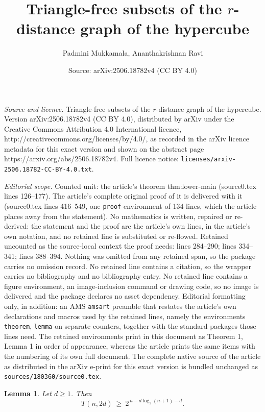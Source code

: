 \documentclass[10pt,a4paper]{amsart}
\title{Triangle-free subsets of the $r$-distance graph of the hypercube}
\author{Padmini Mukkamala, Ananthakrishnan Ravi}
\date{Source: arXiv:2506.18782v4 (CC BY 4.0)}
\newtheorem{lemma}{Lemma}
\begin{document}
\maketitle

\noindent\emph{Source and licence.} Triangle-free subsets of the $r$-distance graph of the hypercube. Version arXiv:2506.18782v4 (CC BY 4.0), distributed by arXiv under the Creative Commons Attribution 4.0 International licence, http://creativecommons.org/licenses/by/4.0/, as recorded in the arXiv licence metadata for this exact version and shown on the abstract page https://arxiv.org/abs/2506.18782v4. Full licence notice: \texttt{licenses/arxiv-2506.18782-CC-BY-4.0.txt}.\par\smallskip

\noindent\textit{Editorial scope.} Counted unit: the article's theorem thm:lower-main (source0.tex lines 126--177). The article's complete original proof of it is delivered with it (source0.tex lines 416--549, one \texttt{proof} environment of 134 lines, which the article places away from the statement). No mathematics is written, repaired or re-derived: the statement and the proof are the article's own lines, in the article's own notation, and no retained line is substituted or re-flowed.  Retained uncounted as the source-local context the proof needs: lines 284--290; lines 334--341; lines 388--394.  Nothing was omitted from any retained span, so the package carries no omission record.  No retained line contains a citation, so the wrapper carries no bibliography and no bibliography entry.  No retained line contains a figure environment, an image-inclusion command or drawing code, so no image is delivered and the package declares no asset dependency.  Editorial formatting only, in addition: an AMS \texttt{amsart} preamble that restates the article's own declarations and macros used by the retained lines, namely the environments \texttt{theorem}, \texttt{lemma} on separate counters, together with the standard packages those lines need.  The retained environments print in this document as Theorem 1, Lemma 1 in order of appearance, whereas the article prints the same items with the numbering of its own full document.  The complete native source of the article as distributed in the arXiv e-print for this exact version is bundled unchanged as \texttt{sources/180360/source0.tex}.
\begin{lemma}\label{lem:bch}
Let $d\ge 1$.
Then
\[
T(n,2d)\ \ge\ 2^{\,n-d\log_2(n+1)-d}.
\]
\end{lemma}
\end{document}

